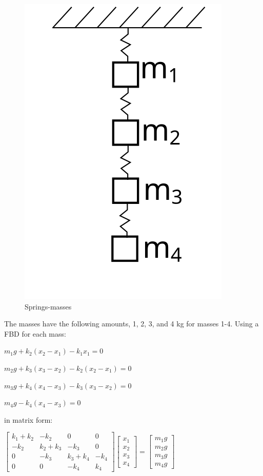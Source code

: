 \documentclass[11pt]{article}
\makeatletter
\def\maxwidth{\ifdim\Gin@nat@width>\linewidth\linewidth
    \else\Gin@nat@width\fi}
\let\Oldincludegraphics\includegraphics
\renewcommand{\includegraphics}[1]{\Oldincludegraphics[width=.8\maxwidth]{#1}}
\makeatother
\begin{document}
\begin{figure}[htbp]
\centering
\includegraphics{../lecture_09/mass_springs.svg}
\caption{Springs-masses}
\end{figure}

The masses have the following amounts, 1, 2, 3, and 4 kg for masses 1-4.
Using a FBD for each mass:

\(m_{1}g+k_{2}(x_{2}-x_{1})-k_{1}x_{1}=0\)

\(m_{2}g+k_{3}(x_{3}-x_{2})-k_{2}(x_{2}-x_{1})=0\)

\(m_{3}g+k_{4}(x_{4}-x_{3})-k_{3}(x_{3}-x_{2})=0\)

\(m_{4}g-k_{4}(x_{4}-x_{3})=0\)

in matrix form:

\(\left[ \begin{array}{cccc} k_1+k_2 & -k_2 & 0 & 0 \\ -k_2 & k_2+k_3 & -k_3 & 0 \\ 0 & -k_3 & k_3+k_4 & -k_4 \\ 0 & 0 & -k_4 & k_4 \end{array} \right] \left[ \begin{array}{c} x_{1} \\ x_{2} \\ x_{3} \\ x_{4} \end{array} \right]= \left[ \begin{array}{c} m_{1}g \\ m_{2}g \\ m_{3}g \\ m_{4}g \end{array} \right]\)
\end{document}
